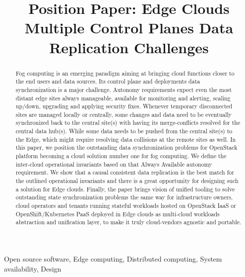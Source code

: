 \documentclass[conference]{IEEEtran}
\begin{document}
\title{Position Paper: Edge Clouds Multiple Control Planes Data Replication
Challenges\\
}

\author{
}

\maketitle

\begin{abstract}
Fog computing is an emerging paradigm aiming at bringing cloud functions closer
to the end users and data sources. Its control plane and deployments data
synchronization is a major challenge. Autonomy requirements expect even the
most distant edge sites always manageable, available for monitoring and
alerting, scaling up/down, upgrading and applying security fixes. Whenever
temporary disconnected sites are managed locally or centrally, some changes
and data need to be eventually synchronized back to the central site(s) with
having its merge-conflicts resolved for the central data hub(s). While some
data needs to be pushed from the central site(s) to the Edge, which might
require resolving data collisions at the remote sites as well. In this paper,
we position the outstanding data synchronization problems for OpenStack
platform becoming a cloud solution number one for fog computing. We define
the inter-cloud operational invariants based on that Always Available
autonomy requirement. We show that a causal consistent data replication is
the best match for the outlined operational invariants and there is a great
opportunity for designing such a solution for Edge clouds. Finally, the paper
brings vision of unified tooling to solve outstanding state synchronization
problems the same way for infrastructure owners, cloud operators and tenants
running stateful workloads hosted on OpenStack IaaS or OpenShift/Kubernetes
PaaS deployed in Edge clouds as multi-cloud workloads abstraction and
unification layer, to make it truly cloud-vendors agnostic and portable.
\end{abstract}

\begin{IEEEkeywords}
Open source software, Edge computing, Distributed computing, System
availability, Design
\end{IEEEkeywords}
\end{document}
